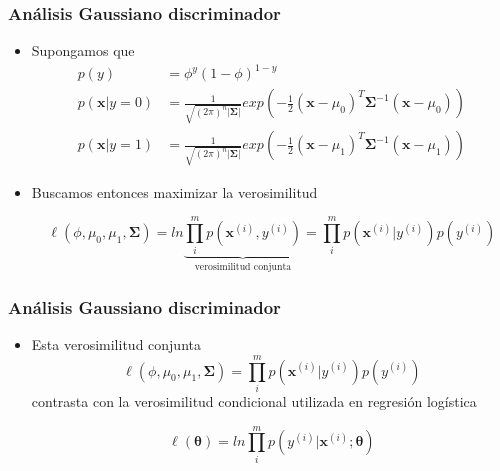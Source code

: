 \documentclass{beamer}
\begin{document}
\begin{frame}
\frametitle{Análisis Gaussiano discriminador}

\begin{itemize}
\item Supongamos que 
\begin{equation*}
\begin{split}
p(y) &=\phi^y(1-\phi)^{1-y}\\
p(\boldsymbol{x}\vert y=0) &= \frac{1}{\sqrt{(2\pi)^n \vert  \boldsymbol{\Sigma} \vert }} exp \left( -\frac{1}{2} (\boldsymbol{x}-\mu_0)^T  \boldsymbol{\Sigma}^{-1} (\boldsymbol{x}-\mu_0) \right)  \\
p(\boldsymbol{x}\vert y=1) &= \frac{1}{\sqrt{(2\pi)^n \vert  \boldsymbol{\Sigma} \vert }} exp \left( -\frac{1}{2} (\boldsymbol{x}-\mu_1)^T  \boldsymbol{\Sigma}^{-1} (\boldsymbol{x}-\mu_1) \right)
\end{split}
\end{equation*}

\item Buscamos entonces maximizar la verosimilitud 

\begin{equation*}
\ell (\phi, \mu_0, \mu_1, \boldsymbol{\Sigma})= ln  \underbrace{\prod_{i}^{m}{p(\boldsymbol{x}^{(i)},y^{(i)})}}_\text{verosimilitud conjunta} = \prod_{i}^{m}{p(\boldsymbol{x}^{(i)}\vert y^{(i)}) p(y^{(i)})}
\end{equation*}
\end{itemize}


\end{frame}
\begin{frame}
\frametitle{Análisis Gaussiano discriminador}
\begin{itemize}
\item Esta verosimilitud conjunta 
\begin{equation*}
\ell (\phi, \mu_0, \mu_1, \boldsymbol{\Sigma})= \prod_{i}^{m}{p(\boldsymbol{x}^{(i)}\vert y^{(i)}) p(y^{(i)})}
\end{equation*}
contrasta con la verosimilitud condicional utilizada en regresión logística

\begin{equation*}
\ell (\boldsymbol{\theta})= ln \prod_{i}^{m} {p(y^{(i)} \vert \boldsymbol{x}^{(i)}; \boldsymbol{\theta})} 
\end{equation*}

\end{itemize}


\end{frame}
\end{document}
